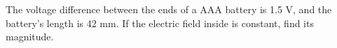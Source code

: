 The voltage difference between the ends of a AAA battery is 1.5 V, and
the battery's length is 42 mm. If the electric field inside is constant,
find its magnitude.\answercheck
